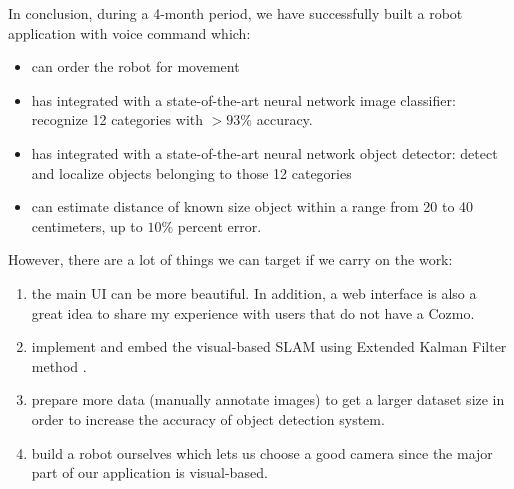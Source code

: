 In conclusion, during a 4-month period, we have successfully built a robot application with voice command which:
\begin{itemize}
	\item can order the robot for movement
	\item has integrated with a state-of-the-art neural network image classifier: recognize 12 categories with $> 93\%$ accuracy.
	\item has integrated with a state-of-the-art neural network object detector: detect and localize objects belonging to those 12 categories
	\item can estimate distance of known size object within a range from 20 to 40 centimeters, up to $10\%$ percent error.
\end{itemize}
However, there are a lot of things we can target if we carry on the work:
\begin{enumerate}
	\item the main UI can be more beautiful. In addition, a web interface is also a great idea to share my experience with users that do not have a Cozmo.
	\item implement and embed the visual-based SLAM \cite{wiki:SLAM} using Extended Kalman Filter method \cite{wiki:Kalman}. 
	\item prepare more data (manually annotate images) to get a larger dataset size in order to increase the accuracy of object detection system.
	\item build a robot ourselves which lets us choose a good camera since the major part of our application is visual-based.
\end{enumerate}